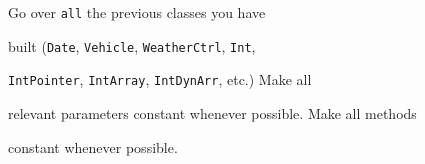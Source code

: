 Go over \texttt{all} the previous classes you have

built (\texttt{Date}, \texttt{Vehicle}, \texttt{WeatherCtrl}, \texttt{Int},

\texttt{IntPointer}, \texttt{IntArray}, \texttt{IntDynArr}, etc.) Make all

relevant parameters constant whenever possible. Make all methods

constant whenever possible.

